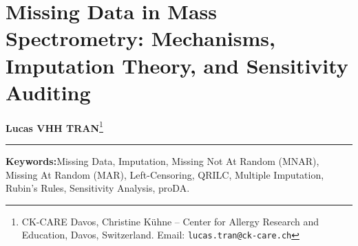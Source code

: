 \documentclass[11pt,oneside]{book}
\begin{document}
\setcounter{chapter}{18}
\chapter{Missing Data in Mass Spectrometry: Mechanisms, Imputation Theory, and Sensitivity Auditing}

\noindent
\textbf{Lucas VHH TRAN}\footnote{CK-CARE Davos, Christine K\"uhne -- Center for Allergy Research and Education, Davos, Switzerland. Email: \texttt{lucas.tran@ck-care.ch}}\\
\rule{\textwidth}{0.8pt}

\begin{abstract}
\noindent
Quantitative mass spectrometry datasets contain between 20\% and 50\% missing values. In clinical biomarker cohorts, this missingness presents an acute methodological problem: standard multivariate algorithms require complete matrices, yet the numerical substitution of missing values alters the variance structure, covariance relationships, and downstream statistical inferences of the entire dataset. Missingness in mass spectrometry does not arise from a single homogeneous process. A feature may be absent due to stochastic precursor selection during instrument duty cycles (Missing at Random; MAR), physical left-censoring below the instrument limit of detection (Missing Not at Random; MNAR), or true biological non-expression. Applying a MAR algorithm such as $k$-nearest neighbors to an MNAR peptide invents artificial intermediate abundances for molecules that were genuinely absent, while applying left-censored substitution to MAR values introduces downward bias and artificially inflates differential abundance discoveries. This chapter establishes the statistical, biophysical, and computational foundations required to diagnose, model, and impute missing data in mass spectrometry. We formalize Rubin's missing data taxonomy within an analytical chemistry context, analyze the mathematical properties of deterministic, stochastic, and machine-learning imputation algorithms, derive Rubin's pooling rules for multiple imputation with Barnard--Rubin small-sample degrees of freedom, and evaluate imputation-free probabilistic dropout modeling (\texttt{proDA}). The chapter concludes with a tutor diagnostic heuristics checklist, an end-to-end reproducible R laboratory, the Five Deadly Sins of omics imputation, and multi-tier exercises with worked solutions.
\end{abstract}

\noindent
\textbf{Keywords:}\enspace Missing Data, Imputation, Missing Not At Random (MNAR), Missing At Random (MAR), Left-Censoring, QRILC, Multiple Imputation, Rubin's Rules, Sensitivity Analysis, proDA.
\end{document}
